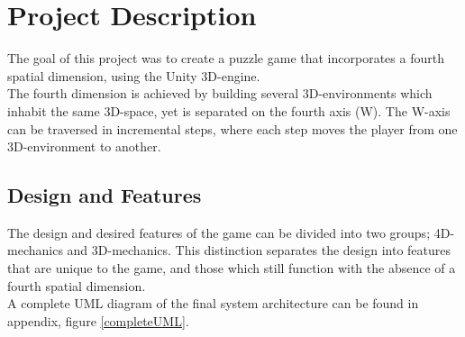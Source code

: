 \section{Project Description}
The goal of this project was to create a puzzle game that incorporates a fourth spatial dimension, using the Unity 3D-engine.\\

The fourth dimension is achieved by building several 3D-environments which inhabit the same 3D-space, yet is separated on the fourth axis (W). The W-axis can be traversed in incremental steps, where each step moves the player from one 3D-environment to another.
 
\subsection{Design and Features}
The design and desired features of the game can be divided into two groups; 4D-mechanics and 3D-mechanics. This distinction separates the design into features that are unique to the game, and those which still function with the absence of a fourth spatial dimension.\\

A complete UML diagram of the final system architecture can be found in appendix, figure \ref{completeUML}.


